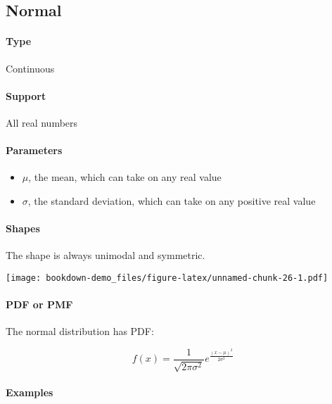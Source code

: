 \documentclass[]{book}
\providecommand{\tightlist}{%
  \setlength{\itemsep}{0pt}\setlength{\parskip}{0pt}}
\let\oldparagraph\paragraph
\renewcommand{\paragraph}[1]{\oldparagraph{#1}\mbox{}}
\begin{document}
\hypertarget{normal}{%
\subsection{Normal}\label{normal}}

\hypertarget{type}{%
\paragraph{Type}\label{type}}

Continuous

\hypertarget{support}{%
\paragraph{Support}\label{support}}

All real numbers

\hypertarget{parameters}{%
\paragraph{Parameters}\label{parameters}}

\begin{itemize}
\tightlist
\item
  \(\mu\), the mean, which can take on any real value
\item
  \(\sigma\), the standard deviation, which can take on any positive real value
\end{itemize}

\hypertarget{shapes}{%
\paragraph{Shapes}\label{shapes}}

The shape is always unimodal and symmetric.

\texttt{[image: bookdown-demo\_files/figure-latex/unnamed-chunk-26-1.pdf]}

\hypertarget{pdf-or-pmf}{%
\paragraph{PDF or PMF}\label{pdf-or-pmf}}

The normal distribution has PDF:

\[ f(x) = \frac{1}{\sqrt{2\pi\sigma^2}}e^{\frac{(x-\mu)^2}{2\sigma^2}}\]

\hypertarget{examples}{%
\paragraph{Examples}\label{examples}}
\end{document}
